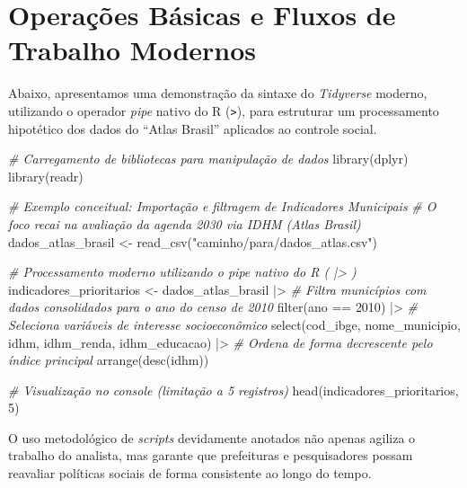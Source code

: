 \documentclass[
  brazilian,
  11pt,
  a4paper,
  open = right,
  twoside = true]{scrbook}
\newenvironment{Shaded}{\begin{snugshade}}{\end{snugshade}}
\newcommand{\CommentTok}[1]{\textcolor[rgb]{0.32,0.36,0.40}{\textit{#1}}}
\newcommand{\DecValTok}[1]{\textcolor[rgb]{0.55,0.29,0.58}{#1}}
\newcommand{\FunctionTok}[1]{\textcolor[rgb]{1.00,0.23,0.00}{#1}}
\newcommand{\NormalTok}[1]{\textcolor[rgb]{0.10,0.10,0.10}{#1}}
\newcommand{\OtherTok}[1]{\textcolor[rgb]{0.10,0.10,0.10}{#1}}
\newcommand{\SpecialCharTok}[1]{\textcolor[rgb]{0.85,0.00,0.31}{#1}}
\newcommand{\StringTok}[1]{\textcolor[rgb]{0.00,0.72,0.25}{#1}}
\begin{document}
\chapter{Operações Básicas e Fluxos de Trabalho
Modernos}\label{operauxe7uxf5es-buxe1sicas-e-fluxos-de-trabalho-modernos}

Abaixo, apresentamos uma demonstração da sintaxe do \emph{Tidyverse}
moderno, utilizando o operador \emph{pipe} nativo do R
(\texttt{\textbar{}\textgreater{}}), para estruturar um processamento
hipotético dos dados do ``Atlas Brasil'' aplicados ao controle social.

\begin{Shaded}
\begin{Highlighting}[numbers=left,,]
\CommentTok{\# Carregamento de bibliotecas para manipulação de dados}
\FunctionTok{library}\NormalTok{(dplyr)}
\FunctionTok{library}\NormalTok{(readr)}

\CommentTok{\# Exemplo conceitual: Importação e filtragem de Indicadores Municipais}
\CommentTok{\# O foco recai na avaliação da agenda 2030 via IDHM (Atlas Brasil)}
\NormalTok{dados\_atlas\_brasil }\OtherTok{\textless{}{-}} \FunctionTok{read\_csv}\NormalTok{(}\StringTok{"caminho/para/dados\_atlas.csv"}\NormalTok{)}

\CommentTok{\# Processamento moderno utilizando o pipe nativo do R ( |\textgreater{} )}
\NormalTok{indicadores\_prioritarios }\OtherTok{\textless{}{-}}\NormalTok{ dados\_atlas\_brasil }\SpecialCharTok{|\textgreater{}}
  \CommentTok{\# Filtra municípios com dados consolidados para o ano do censo de 2010}
  \FunctionTok{filter}\NormalTok{(ano }\SpecialCharTok{==} \DecValTok{2010}\NormalTok{) }\SpecialCharTok{|\textgreater{}}
  \CommentTok{\# Seleciona variáveis de interesse socioeconômico}
  \FunctionTok{select}\NormalTok{(cod\_ibge, nome\_municipio, idhm, idhm\_renda, idhm\_educacao) }\SpecialCharTok{|\textgreater{}}
  \CommentTok{\# Ordena de forma decrescente pelo índice principal}
  \FunctionTok{arrange}\NormalTok{(}\FunctionTok{desc}\NormalTok{(idhm))}

\CommentTok{\# Visualização no console (limitação a 5 registros)}
\FunctionTok{head}\NormalTok{(indicadores\_prioritarios, }\DecValTok{5}\NormalTok{)}
\end{Highlighting}
\end{Shaded}

O uso metodológico de \emph{scripts} devidamente anotados não apenas
agiliza o trabalho do analista, mas garante que prefeituras e
pesquisadores possam reavaliar políticas sociais de forma consistente ao
longo do tempo.
\end{document}
